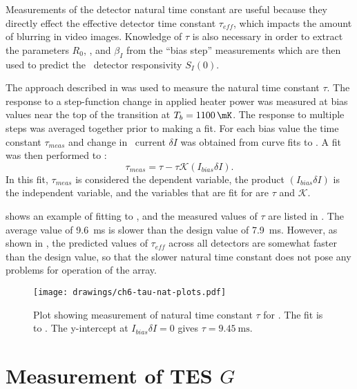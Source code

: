 
Measurements of the detector natural time constant are useful because they directly effect the effective detector time constant $\tau_{eff}$, which impacts the amount of blurring in video images.
Knowledge of $\tau$ is also necessary in order to extract the parameters $R_0$, \Loop, and $\beta_I$ from the ``bias step'' measurements which are then used to predict the \DC\ detector responsivity $S_I(0)$.

The approach described in  was used to measure the natural time constant $\tau$.
The response to a step-function change in applied heater power was measured at bias values near the top of the transition at $T_{b} = \SI{1100}{\mK}$.
The response to multiple steps was averaged together prior to making a fit.
For each bias value the time constant $\tau_{meas}$ and change in \TES\ current $\delta I$ was obtained from curve fits to .
A fit was then performed to :
\begin{equation} \label{eqn:tau-nat-fit}
  \tau_{meas} = \tau - \tau \mathcal{K} (I_{bias} \delta I).
\end{equation}
In this fit, $\tau_{meas}$ is considered the dependent variable, the product $(I_{bias} \delta I)$ is the independent variable, and the variables that are fit for are $\tau$ and $\mathcal{K}$.

 shows an example of fitting to , and the measured values of $\tau$ are listed in .
The average value of \SI{9.6}{\ms} is  slower than the design value of \SI{7.9}{\ms}.
However, as shown in , the predicted values of $\tau_{eff}$ across all detectors are somewhat faster than the design value, so that the slower natural time constant does not pose any problems for operation of the array.

\begin{figure*}
  \centering
\texttt{[image: drawings/ch6-tau-nat-plots.pdf]}
\caption[Plot showing measurement of natural time constant $\tau$]{
  Plot showing measurement of natural time constant $\tau$ for . The fit is to .
  The y-intercept at $I_{bias} \delta I = 0$ gives $\tau = \SI{9.45}{\ms}$.
} 
\label{fig:tau-nat-plots}
\end{figure*}

\section{Measurement of \textsc{TES} $G$} \label{sec:g-psat}

